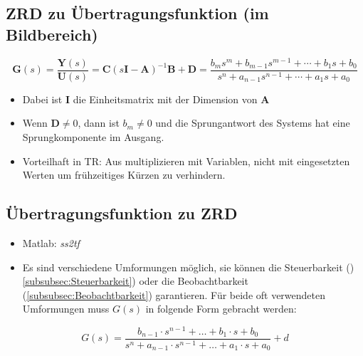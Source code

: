 \subsection{ZRD zu Übertragungsfunktion (im Bildbereich) }

\begin{equation}
\label{eq:ss2tf}
	\boldsymbol{G}\left( s \right) = \frac{\boldsymbol{Y}\left( s \right)}{\boldsymbol{U}\left( s\right)} = \boldsymbol{C}\left( s\boldsymbol{I}-\boldsymbol{A}\right)^{-1}\boldsymbol{B}+\boldsymbol{D} = \frac{b_{m} s^{m} + b_{m-1} s^{m-1} +\cdots+b_{1} s + b_{0}}{s^{n} + a_{n-1} s^{n-1} + \cdots + a_{1} s + a_{0}}
\end{equation}
\begin{itemize}
	\item Dabei ist $\boldsymbol{I}$ die Einheitsmatrix mit der Dimension von $\boldsymbol{A}$
	\item  Wenn $\boldsymbol{D} \neq 0$, dann ist $b_m \neq 0$ und die Sprungantwort des Systems hat eine Sprungkomponente im Ausgang.
	\item Vorteilhaft in TR: Aus multiplizieren mit Variablen, nicht mit eingesetzten Werten um frühzeitiges Kürzen zu verhindern.
\end{itemize}

\subsection{Übertragungsfunktion zu ZRD}
\begin{itemize}
	\item Matlab: \textit{ss2tf}
	\item Es sind verschiedene Umformungen möglich, sie können die Steuerbarkeit ()\ref{subsubsec:Steuerbarkeit}) oder die Beobachtbarkeit (\ref{subsubsec:Beobachtbarkeit}) garantieren. Für beide oft verwendeten Umformungen muss $G\left( s\right)$ in folgende Form gebracht werden:
\end{itemize}
\begin{equation*}
	G \left( s\right) = \frac{b_{n-1}\cdot s^{n-1}+\ldots+b_1\cdot s+b_0}{s^n+a_{n-1}\cdot s^{n-1}+\ldots+a_1\cdot s+a_0}+d
\end{equation*}
